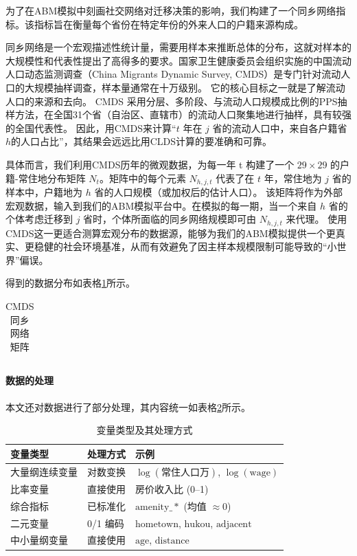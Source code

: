 \documentclass[
  a4paper,
  zihao=-4,
  fontset=mac,
  AutoFakeBold,
  AutoFakeSlant,
  oneside]{ctexbook}
\begin{document}
为了在ABM模拟中刻画社交网络对迁移决策的影响，我们构建了一个同乡网络指标。该指标旨在衡量每个省份在特定年份的外来人口的户籍来源构成。

同乡网络是一个宏观描述性统计量，需要用样本来推断总体的分布，这就对样本的大规模性和代表性提出了高得多的要求。国家卫生健康委员会组织实施的中国流动人口动态监测调查（China Migrants Dynamic Survey, CMDS）是专门针对流动人口的大规模抽样调查，样本量通常在十万级别。
它的核心目标之一就是了解流动人口的来源和去向。
CMDS 采用分层、多阶段、与流动人口规模成比例的PPS抽样方法，在全国31个省（自治区、直辖市）的流动人口聚集地进行抽样，具有较强的全国代表性。
因此，用CMDS来计算“$t$ 年在 $j$ 省的流动人口中，来自各户籍省$h$的人口占比”，其结果会远远比用CLDS计算的要准确和可靠。

具体而言，我们利用CMDS历年的微观数据，为每一年 t 构建了一个 $29 \times 29$ 的户籍-常住地分布矩阵 $N_t$。矩阵中的每个元素 $N_{h,j,t}$ 代表了在 $t$ 年，常住地为 $j$ 省的样本中，户籍地为 $h$ 省的人口规模（或加权后的估计人口）。
该矩阵将作为外部宏观数据，输入到我们的ABM模拟平台中。在模拟的每一期，当一个来自 $h$ 省的个体考虑迁移到 $j$ 省时，个体所面临的同乡网络规模即可由 $N_{h,j,t}$ 来代理。
使用CMDS这一更适合测算宏观分布的数据源，能够为我们的ABM模拟提供一个更真实、更稳健的社会环境基准，从而有效避免了因主样本规模限制可能导致的“小世界”偏误。

得到的数据分布如表格\ref{tab:CMDS同乡网络矩阵}所示。

\begin{table}[!ht]
\centering
\caption{CMDS同乡网络矩阵}
\begin{tabularx}{\textwidth}{@{}cXXX@{}}
\toprule
\midrule
\bottomrule
\end{tabularx}
\label{tab:CMDS同乡网络矩阵}
\end{table}





\paragraph{数据的处理}

本文还对数据进行了部分处理，其内容统一如表格\ref{tab:variable_processing}所示。

\begin{table}[htbp]
\centering
\caption{变量类型及其处理方式}
\label{tab:variable_processing}
\begin{tabular}{lll}
\toprule
变量类型 & 处理方式 & 示例 \\
\midrule
大量纲连续变量 & 对数变换 & $\log(\text{常住人口万})$, $\log(\text{wage})$ \\
比率变量 & 直接使用 & 房价收入比 (0--1) \\
综合指标 & 已标准化 & $\text{amenity}\_*$ (均值 $\approx 0$) \\
二元变量 & 0/1 编码 & $\text{hometown}$, $\text{hukou}$, $\text{adjacent}$ \\
中小量纲变量 & 直接使用 & $\text{age}$, $\text{distance}$ \\
\bottomrule
\end{tabular}
\end{table}
\end{document}
